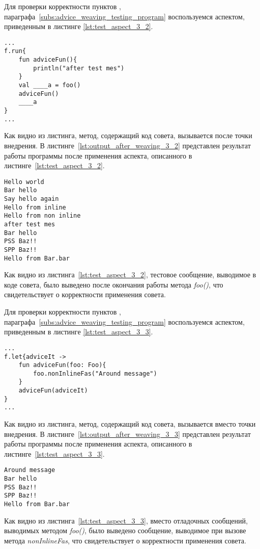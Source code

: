 Для проверки корректности пунктов \quotes{\ref{list:after_advice_weaving_check}},
\quotes{\ref{list:program_work_check}} параграфа~\ref{subs:advice_weaving_testing_program} воспользуемся аспектом, приведенным в листинге \ref{lst:test_aspect_3_2}.
\begin{lstlisting}[style={java}, label={lst:result_of_weaving_3_2},
 caption={Результат применения аспекта, описанного в листинге~\ref{lst:test_aspect_3_2}, к тестовой программе}]
...
f.run{
	fun adviceFun(){
        println("after test mes")
    }
	val ____a = foo()
	adviceFun()
	____a
}
...
\end{lstlisting}
Как видно из листинга, метод, содержащий код совета, вызывается после точки внедрения.
В листинге~\ref{lst:output_after_weaving_3_2} представлен результат работы программы после применения аспекта, описанного в листинге~\ref{lst:test_aspect_3_2}. 
\begin{lstlisting}[style={java}, label={lst:output_after_weaving_3_2},
 caption={Результат работы программы после применения аспекта, описанного в листинге~\ref{lst:test_aspect_3_2}}]
Hello world
Bar hello
Say hello again
Hello from inline
Hello from non inline
after test mes
Bar hello
PSS Baz!!
SPP Baz!!
Hello from Bar.bar
\end{lstlisting}
Как видно из листинга~\ref{lst:test_aspect_3_2}, тестовое сообщение, выводимое в коде совета, было выведено после окончания работы метода \textit{foo()}, что свидетельствует о корректности применения совета.

Для проверки корректности пунктов \quotes{\ref{list:around_advice_weaving_check}},
\quotes{\ref{list:program_work_check}} параграфа~\ref{subs:advice_weaving_testing_program} воспользуемся аспектом, приведенным в листинге \ref{lst:test_aspect_3_3}.
\begin{lstlisting}[style={java}, label={lst:result_of_weaving_3_3},
 caption={Результат применения аспекта, описанного в листинге~\ref{lst:test_aspect_3_3}, к тестовой программе}]
...
f.let{adviceIt ->
	fun adviceFun(foo: Foo){
        foo.nonInlineFas("Around message")
    }
	adviceFun(adviceIt)
}
...
\end{lstlisting}
Как видно из листинга, метод, содержащий код совета, вызывается вместо точки внедрения.
В листинге~\ref{lst:output_after_weaving_3_3} представлен результат работы программы после применения аспекта, описанного в листинге~\ref{lst:test_aspect_3_3}. 
\begin{lstlisting}[style={java}, label={lst:output_after_weaving_3_3},
 caption={Результат работы программы после применения аспекта, описанного в листинге~\ref{lst:test_aspect_3_3}}]
Around message
Bar hello
PSS Baz!!
SPP Baz!!
Hello from Bar.bar
\end{lstlisting}
Как видно из листинга~\ref{lst:test_aspect_3_3}, вместо отладочных сообщений, выводимых методом \textit{foo()}, было выведено сообщение, выводимое при вызове метода \textit{nonInlineFas}, что свидетельствует о корректности применения совета.

